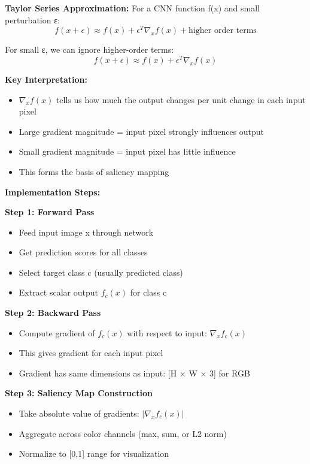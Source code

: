 \documentclass[12pt]{article}
\newcommand{\explanation}[1]{{\color{explanationcolor}#1}}
\begin{document}
\begin{enumerate}[(a)]
{{    \textbf{Taylor Series Approximation:}
    For a CNN function f(x) and small perturbation ε:
    \[
    f(x + \epsilon) \approx f(x) + \epsilon^T \nabla_x f(x) + \text{higher order terms}
    \]
    
    For small ε, we can ignore higher-order terms:
    \[
    f(x + \epsilon) \approx f(x) + \epsilon^T \nabla_x f(x)
    \]
    
    \textbf{Key Interpretation:}
    \begin{itemize}
        \item $\nabla_x f(x)$ tells us how much the output changes per unit change in each input pixel
        \item Large gradient magnitude = input pixel strongly influences output
        \item Small gradient magnitude = input pixel has little influence
        \item This forms the basis of saliency mapping
    \end{itemize}
    }
    
    \textbf{Implementation Steps:}
    
    \explanation{
    \textbf{Step 1: Forward Pass}
    \begin{itemize}
        \item Feed input image x through network
        \item Get prediction scores for all classes
        \item Select target class c (usually predicted class)
        \item Extract scalar output $f_c(x)$ for class c
    \end{itemize}
    
    \textbf{Step 2: Backward Pass}
    \begin{itemize}
        \item Compute gradient of $f_c(x)$ with respect to input: $\nabla_x f_c(x)$
        \item This gives gradient for each input pixel
        \item Gradient has same dimensions as input: [H × W × 3] for RGB
    \end{itemize}
    
    \textbf{Step 3: Saliency Map Construction}
    \begin{itemize}
        \item Take absolute value of gradients: $|\nabla_x f_c(x)|$
        \item Aggregate across color channels (max, sum, or L2 norm)
        \item Normalize to [0,1] range for visualization
    \end{itemize}
    
}}
\end{enumerate}
\end{document}
